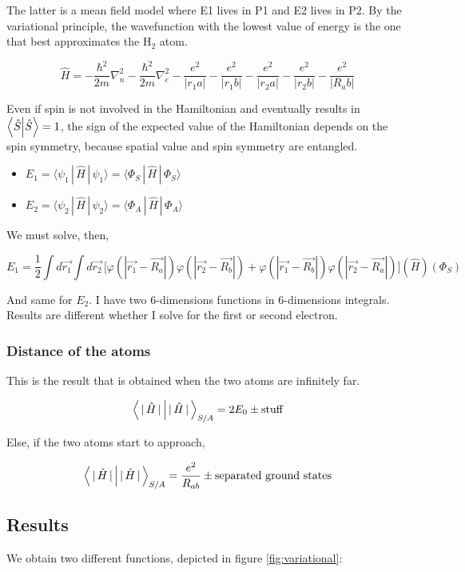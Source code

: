 	The latter is a mean field model where E1 lives in P1 and E2 lives in P2.
	By the variational principle, the wavefunction with the lowest value of energy is the one that best approximates the H$_2$ atom.

	$$\hat{H}=-\frac{\hbar^2}{2m}\nabla_n^2-\frac{\hbar^2}{2m}\nabla_e^2-\frac{e^2}{|r_1a|}-\frac{e^2}{|r_1b|}-\frac{e^2}{|r_2a|}-\frac{e^2}{|r_2b|}-\frac{e^2}{|R_ab|}$$

	Even if spin is not involved in the Hamiltonian and eventually results in $\braket{\hat{S}}{\hat{S}}=1$, the sign of the expected value of the Hamiltonian depends on the spin symmetry, because spatial value and spin symmetry are entangled.

	\begin{multicols}{2}
		\begin{itemize}
			\item $E_1=\langle{\psi_1\,|\,\hat{H}\,|\,\psi_1}\rangle =\langle{\Phi_S\,|\,\hat{H}\,|\,\Phi_S}\rangle$
			\item $E_2=\langle{\psi_2\,|\,\hat{H}\,|\,\psi_2}\rangle=\langle{\Phi_A\,|\,\hat{H}\,|\,\Phi_A}\rangle$
		\end{itemize}
	\end{multicols}

	We must solve, then,

	$$E_1=\frac{1}{2}\int d\vec{r_1}\int d\vec{r_2}\,\big[\varphi(|\vec{r_1}-\vec{R_a}|)\varphi(|\vec{r_2}-\vec{R_b}|)+\varphi(|\vec{r_1}-\vec{R_b}|)\varphi(|\vec{r_2}-\vec{R_a}|)\big](\hat{H})(\Phi_S)$$

	And same for $E_2$.
	I have two 6-dimensions functions in 6-dimensions integrals.
	Results are different whether I solve for the first or second electron.

		\subsubsection{Distance of the atoms}
		This is the result that is obtained when the two atoms are infinitely far.

		$$\braket{\,|\,\hat{H}\,|\,}_{S/A}=2E_0\pm\text{stuff}$$

		Else, if the two atoms start to approach,

		$$\braket{\,|\,\hat{H}\,|\,}_{S/A}=\frac{e^2}{R_{ab}}\pm\text{separated ground states}$$

	\subsection{Results}
	We obtain two different functions, depicted in figure \ref{fig:variational}:

